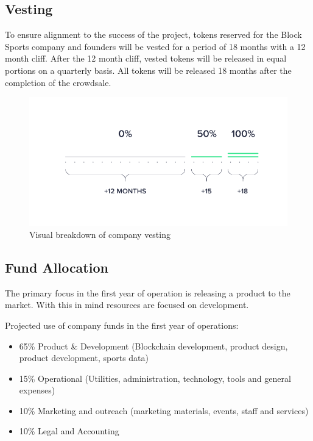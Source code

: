 \documentclass{article}
\begin{document}
	\subsection{Vesting}
To ensure alignment to the success of the project, tokens reserved for the Block Sports company and founders will be vested for a period of 18 months with a 12 month cliff. After the 12 month cliff, vested tokens will be released in equal portions on a quarterly basis. All tokens will be released 18 months after the completion of the crowdsale.

\begin{figure}[!htb]
\centering
\includegraphics[scale=.3]{./images/vesting-diagram.png}
\caption{Visual breakdown of company vesting}
\label{figure:vesting}
\end{figure}


	\subsection{Fund Allocation}
The primary focus in the first year of operation is releasing a product to the market. With this in mind resources are focused on development.

Projected use of company funds in the first year of operations:

\begin{itemize}
	\item  65\% Product \& Development (Blockchain development, product design, product development, sports data)
	\item 15\% Operational (Utilities, administration, technology, tools and general expenses)
	\item 10\% Marketing and outreach (marketing materials, events, staff and services)
	\item 10\% Legal and Accounting
\end{itemize}
\end{document}
